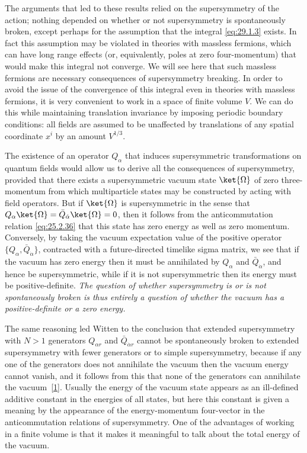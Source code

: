 The arguments that led to these results relied on the supersymmetry of the
action; nothing depended on whether or not supersymmetry is spontaneously
broken, except perhaps for the assumption that the integral
\eqref{eq:29.1.3} exists. In fact this assumption may be violated in
theories with massless fermions, which can have long range effects (or,
equivalently, poles at zero four-momentum) that would make this integral
not converge. We will see here that such massless fermions are necessary
consequences of supersymmetry breaking. In order to avoid the issue of the
convergence of this integral even in theories with massless fermions, it is
very convenient to work in a space of finite volume \(V\). We can do this
while maintaining translation invariance by imposing periodic boundary
conditions: all fields are assumed to be unaffected by translations of any
spatial coordinate \(x^i\) by an amount \(V^{1/3}\).

The existence of an operator \(Q_\alpha\) that induces supersymmetric
transformations on quantum fields would allow us to derive all the
consequences of supersymmetry, provided that there exists a supersymmetric
vacuum state \(\ket{\Omega}\) of zero three-momentum from which
multiparticle states may be constructed by acting with field operators.
But if \(\ket{\Omega}\) is supersymmetric in the sense that
\(Q_\alpha\ket{\Omega}=\bar Q_{\dot\alpha}\ket{\Omega}=0\), then it
follows from the anticommutation
relation \eqref{eq:25.2.36} that this state has zero energy as well as zero
momentum. Conversely, by taking the vacuum expectation value of the
positive operator
\(\{Q_\alpha,\bar Q_{\dot\alpha}\}\), contracted with a future-directed
timelike sigma matrix, we see that if the vacuum has zero energy then it
must be annihilated by \(Q_\alpha\) and \(\bar Q_{\dot\alpha}\), and
hence be supersymmetric, while
if it is not supersymmetric then its energy must be positive-definite.
\emph{The question of whether supersymmetry is or is not spontaneously
broken is thus entirely a question of whether the vacuum has a
positive-definite or a zero energy.}

The same reasoning led Witten to the conclusion that extended
supersymmetry with \(N>1\) generators \(Q_{\alpha r}\) and
\(\bar Q_{\dot\alpha r}\) cannot be spontaneously broken to extended supersymmetry
with fewer generators or to simple supersymmetry, because if any one of
the generators does not annihilate the vacuum then the vacuum energy
cannot vanish, and it follows from this that none of the generators can
annihilate the vacuum~\hyperref[ch29-ref-1]{[1]}. Usually the energy of the
vacuum state appears as an ill-defined additive constant in the energies
of all states, but here this constant is given a meaning by the appearance
of the energy-momentum four-vector in the anticommutation relations of
supersymmetry. One of the advantages of working in a finite volume is that
it makes it meaningful to talk about the total energy of the vacuum.

